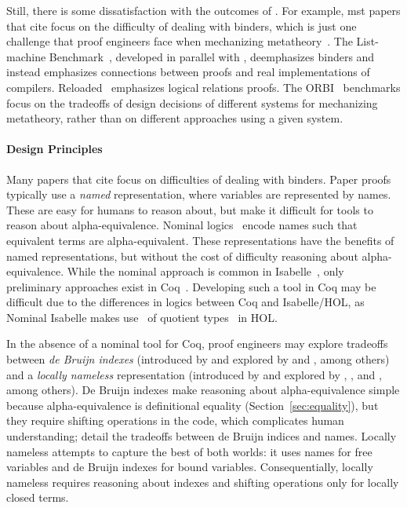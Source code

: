 Still, there is some dissatisfaction with the outcomes of \poplmark.
For example, mst papers that cite \poplmark focus on the difficulty of dealing with
binders, which is just one challenge that proof engineers face when
mechanizing metatheory~\citep{piercenal}. The List-machine Benchmark~\citep{appel2012list},
developed in parallel with \poplmark, deemphasizes
binders and instead emphasizes connections between proofs and real
implementations of compilers. 
\poplmark Reloaded~\citep{abel2017poplmark} emphasizes
logical relations proofs. The ORBI~\citep{felty2018benchmarks, felty2015benchmarks} benchmarks
focus on the tradeoffs of design decisions of different systems for mechanizing metatheory,
rather than on different approaches using a given system.

\paragraph{Design Principles} 
Many papers that cite \poplmark focus on difficulties of dealing with binders. Paper proofs
typically use a \textit{named} representation, where variables are
represented by names. These are easy for humans to reason about, but
make it difficult for tools to reason about alpha-equivalence.
Nominal logics~\citep{Aydemir2006, Urban2008} encode names such that
equivalent terms are alpha-equivalent. These representations have
the benefits of named representations, but without the cost of
difficulty reasoning about alpha-equivalence. While the nominal
approach is common in Isabelle~\citep{Urban2008}, only preliminary
approaches exist in Coq~\citep{Aydemir2006}. %
Developing such a tool in Coq may be difficult due
to the differences in logics between Coq and Isabelle/HOL, as Nominal Isabelle
makes use~\citep{urban2011} of quotient types~\citep{Homeier05} in HOL. 

In the absence of a nominal tool for Coq, proof engineers may
explore tradeoffs between \textit{de Bruijn indexes}
(introduced by \cite{debruijn1972} and explored by \cite{owens2008} and
\cite{schafer2015}, among others) and a \textit{locally nameless}
representation (introduced by \cite{Gordon1993b} and explored by \cite{Leroy2007}, \cite{Aydemir2008},
and \cite{Chargueraud2011}, among others). De Bruijn indexes make reasoning
about alpha-equivalence simple because alpha-equivalence is
definitional equality (Section~\ref{sec:equality}), but they require shifting operations in the code,
which complicates human understanding; 
\cite{Berghofer2007} detail the tradeoffs between de Bruijn indices and names.
Locally nameless attempts to capture the best of both worlds:
it uses names for free variables and de Bruijn indexes
for bound variables. Consequentially, locally nameless requires
reasoning about indexes and shifting operations only for locally closed terms.

